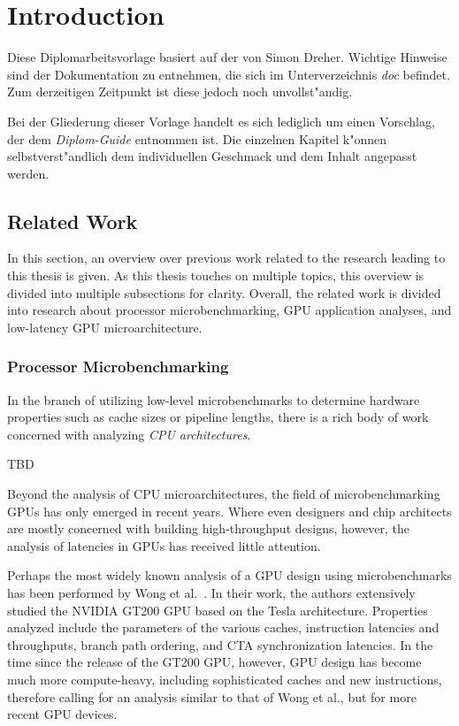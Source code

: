  \chapter{Introduction}
Diese Diplomarbeitsvorlage basiert auf der von Simon Dreher. Wichtige Hinweise sind der Dokumentation zu entnehmen, die sich im Unterverzeichnis \textsl{doc} befindet. Zum derzeitigen Zeitpunkt ist diese jedoch noch unvollst"andig. 

Bei der Gliederung dieser Vorlage handelt es sich lediglich um einen Vorschlag, der dem \textsl{Diplom-Guide} entnommen ist. Die einzelnen Kapitel k"onnen selbstverst"andlich dem individuellen Geschmack und dem Inhalt angepasst werden.

\section{Related Work}

In this section, an overview over previous work related to the research leading to this thesis is given. As this thesis touches on multiple topics, this overview is divided into multiple subsections for clarity. Overall, the related work is divided into research about processor microbenchmarking, GPU application analyses, and low-latency GPU microarchitecture.

\subsection{Processor Microbenchmarking}

In the branch of utilizing low-level microbenchmarks to determine hardware properties such as cache sizes or pipeline lengths, there is a rich body of work concerned with analyzing \textit{CPU architectures}.

TBD

Beyond the analysis of CPU microarchitectures, the field of microbenchmarking GPUs has only emerged in recent years. Where even designers and chip architects are mostly concerned with building high-throughput designs, however, the analysis of latencies in GPUs has received little attention.

Perhaps the most widely known analysis of a GPU design using microbenchmarks has been performed by Wong et al.~\cite{wong:gt200microbenchmark}. In their work, the authors extensively studied the NVIDIA GT200 GPU based on the Tesla architecture. Properties analyzed include the parameters of the various caches, instruction latencies and throughputs, branch path ordering, and CTA synchronization latencies. In the time since the release of the GT200 GPU, however, GPU design has become much more compute-heavy, including sophisticated caches and new instructions, therefore calling for an analysis similar to that of Wong et al., but for more recent GPU devices.

